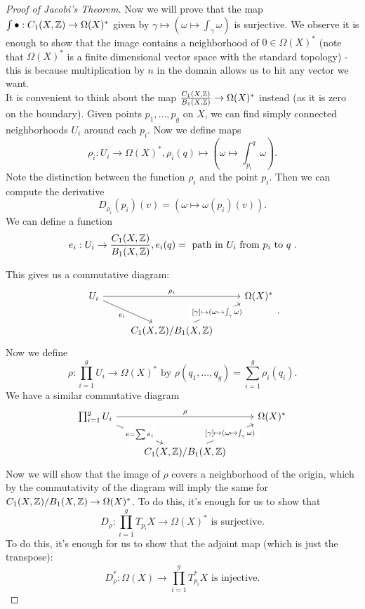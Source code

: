 \documentclass{article}
\begin{document}
{\begin{proof}[Proof of Jacobi's Theorem]
Now we will prove that the map $\int \bullet: C_1(X, \mathbb{Z}) \to \Omega(X)^*$ given by $\gamma \mapsto (\omega \mapsto \int_\gamma \omega)$ is surjective. We observe it is enough to show that the image contains a neighborhood of $0 \in \Omega(X)^*$ (note that $\Omega(X)^*$ is a finite dimensional vector space with the standard topology) - this is because multiplication by $n$ in the domain allows us to hit any vector we want.\\

It is convenient to think about the map $\frac{C_1(X, \mathbb{Z})}{B_1(X, \mathbb{Z})} \to \Omega(X)^*$ instead (as it is zero on the boundary). Given points $p_1, ..., p_g$ on $X$, we can find simply connected neighborhoods $U_i$ around each $p_i$. Now we define maps
\[\rho_i: U_i \to \Omega(X)^*, \rho_i(q) \mapsto (\omega \mapsto \int_{p_i}^q \omega).\]
Note the distinction between the function $\rho_i$ and the point $p_i$. Then we can compute the derivative
\[D_{\rho_i}(p_i)(v) = (\omega \mapsto \omega(p_i)(v)). \]
We can define a function
\[e_i: U_i \to \frac{C_1(X, \mathbb{Z})}{B_1(X, \mathbb{Z})}, e_i(q) = \text{ path in $U_i$ from $p_i$ to $q$ }.\]

This gives us a commutative diagram:
\[\begin{tikzcd}
	{U_i} && {\Omega(X)^*} \\
	& {C_1(X,\Zbb)/B_1(X, \Zbb)}
	\arrow["{\rho_i}", from=1-1, to=1-3]
	\arrow["{e_i}"', from=1-1, to=2-2]
	\arrow["{[\gamma] \mapsto (\omega \mapsto \int_\gamma \omega)}"{description}, from=2-2, to=1-3]
\end{tikzcd}.\]
Now we define
\[\rho: \prod_{i = 1}^g U_i \to \Omega(X)^* \text{ by } \rho(q_1, ...,q_g) = \sum_{i = 1}^g \rho_i(q_i).\]
We have a similar commutative diagram
\[\begin{tikzcd}
	{\prod_{i = 1}^g U_i} && {\Omega(X)^*} \\
	& {C_1(X,\Zbb)/B_1(X, \Zbb)}
	\arrow["\rho", from=1-1, to=1-3]
	\arrow["{e = \sum e_i}"{description}, from=1-1, to=2-2]
	\arrow["{[\gamma] \mapsto (\omega \mapsto \int_\gamma \omega)}"{description}, from=2-2, to=1-3]
\end{tikzcd}\]
Now we will show that the image of $\rho$ covers a neighborhood of the origin, which by the commutativity of the diagram will imply the same for $C_1(X, \mathbb{Z})/B_1(X, \mathbb{Z}) \to \Omega(X)^*$. To do this, it's enough for us to show that
\[D_\rho: \prod_{i = 1}^g T_{p_i} X \to \Omega(X)^* \text{ is surjective}.\]
To do this, it's enough for us to show that the adjoint map (which is just the transpose):
\[D_\rho^*: \Omega(X) \to \prod_{i = 1}^g T_{p_i}^* X \text{ is injective}.\]


\end{proof}}
\end{document}
